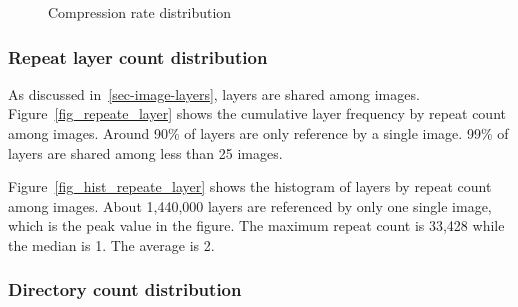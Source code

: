 \begin{figure}[!t]
	\centering
	\caption{Compression rate distribution}
	\label{fig-repeat-layer-cnt}
\end{figure}

\subsubsection{Repeat layer count distribution}

As discussed in~\ref{sec-image-layers}, layers are shared among images. Figure~\ref{fig_repeate_layer} shows the cumulative layer frequency by repeat count among images. Around 90\% of layers are only reference by a single image. 99\% of layers are shared among less than 25 images. 

Figure~\ref{fig_hist_repeate_layer} shows the histogram of layers by repeat count among images. About 1,440,000 layers are referenced by only one single image, which is the peak value in the figure. The maximum repeat count is 33,428 while the median is 1. The average is 2.

\subsubsection{Directory count distribution}

